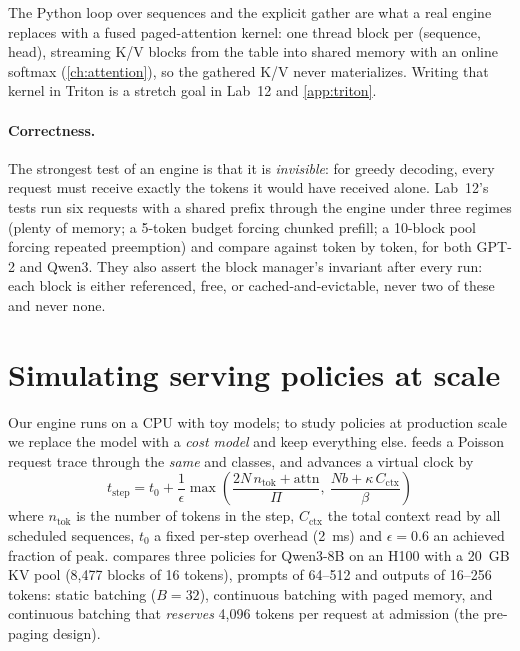 The Python loop over sequences and the explicit gather are what a real engine replaces with a fused
paged-attention kernel: one thread block per (sequence, head), streaming K/V blocks from the table into
shared memory with an online softmax (\cref{ch:attention}), so the gathered K/V never materializes.
Writing that kernel in Triton is a stretch goal in Lab~12 and \cref{app:triton}.

\paragraph{Correctness.} The strongest test of an engine is that it is \emph{invisible}: for greedy
decoding, every request must receive exactly the tokens it would have received alone. Lab~12's tests
run six requests with a shared prefix through the engine under three regimes (plenty of memory; a
5-token budget forcing chunked prefill; a 10-block pool forcing repeated preemption) and compare against
 token by token, for both GPT-2 and Qwen3. They also assert the block
manager's invariant after every run: each block is either referenced, free, or cached-and-evictable,
never two of these and never none.

\section{Simulating serving policies at scale}\label{sec:serving:sim}

Our engine runs on a CPU with toy models; to study policies at production scale we replace the model
with a \emph{cost model} and keep everything else.  feeds a Poisson
request trace through the \emph{same}  and  classes, and advances a
virtual clock by
\begin{equation}
  t_{\text{step}} = t_0 + \frac{1}{\epsilon}\max\!\left(\frac{2N\,n_{\text{tok}} + \text{attn}}{\Pi},\ \frac{Nb + \kappa\,C_{\text{ctx}}}{\beta}\right)
\end{equation}
where $n_{\text{tok}}$ is the number of tokens in the step, $C_{\text{ctx}}$ the total context read by all
scheduled sequences, $t_0$ a fixed per-step overhead (\SI{2}{ms}) and $\epsilon=0.6$ an achieved
fraction of peak.  compares three policies for Qwen3-8B on an H100 with a
\SI{20}{GB} KV pool (8,477 blocks of 16 tokens), prompts of 64--512 and outputs of 16--256 tokens:
static batching ($B=32$), continuous batching with paged memory, and continuous batching that
\emph{reserves} 4,096 tokens per request at admission (the pre-paging design).

